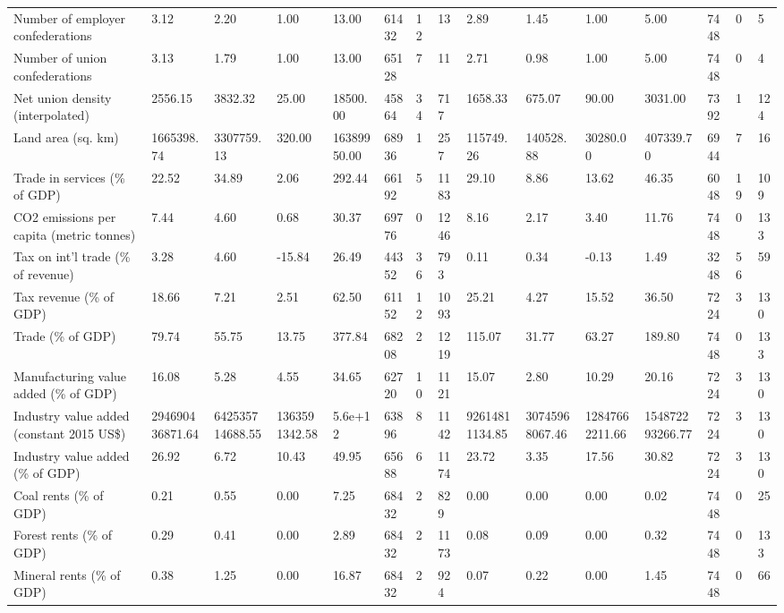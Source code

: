 \begin{longtable}{lllllllllllllll}
\addlinespace
Number of employer confederations & 3.12 & 2.20 & 1.00 & 13.00 & 61432 & 12 & 13 & 2.89 & 1.45 & 1.00 & 5.00 & 7448 & 0 & 5\\
Number of union confederations & 3.13 & 1.79 & 1.00 & 13.00 & 65128 & 7 & 11 & 2.71 & 0.98 & 1.00 & 5.00 & 7448 & 0 & 4\\
Net union density (interpolated) & 2556.15 & 3832.32 & 25.00 & 18500.00 & 45864 & 34 & 717 & 1658.33 & 675.07 & 90.00 & 3031.00 & 7392 & 1 & 124\\
Land area (sq. km) & 1665398.74 & 3307759.13 & 320.00 & 16389950.00 & 68936 & 1 & 257 & 115749.26 & 140528.88 & 30280.00 & 407339.70 & 6944 & 7 & 16\\
Trade in services (\% of GDP) & 22.52 & 34.89 & 2.06 & 292.44 & 66192 & 5 & 1183 & 29.10 & 8.86 & 13.62 & 46.35 & 6048 & 19 & 109\\
\addlinespace
CO2 emissions per capita (metric tonnes) & 7.44 & 4.60 & 0.68 & 30.37 & 69776 & 0 & 1246 & 8.16 & 2.17 & 3.40 & 11.76 & 7448 & 0 & 133\\
Tax on int'l trade (\% of revenue) & 3.28 & 4.60 & -15.84 & 26.49 & 44352 & 36 & 793 & 0.11 & 0.34 & -0.13 & 1.49 & 3248 & 56 & 59\\
Tax revenue (\% of GDP) & 18.66 & 7.21 & 2.51 & 62.50 & 61152 & 12 & 1093 & 25.21 & 4.27 & 15.52 & 36.50 & 7224 & 3 & 130\\
Trade (\% of GDP) & 79.74 & 55.75 & 13.75 & 377.84 & 68208 & 2 & 1219 & 115.07 & 31.77 & 63.27 & 189.80 & 7448 & 0 & 133\\
Manufacturing value added (\% of GDP) & 16.08 & 5.28 & 4.55 & 34.65 & 62720 & 10 & 1121 & 15.07 & 2.80 & 10.29 & 20.16 & 7224 & 3 & 130\\
\addlinespace
Industry value added (constant 2015 US\$) & 294690436871.64 & 642535714688.55 & 1363591342.58 & 5.6e+12 & 63896 & 8 & 1142 & 92614811134.85 & 30745968067.46 & 12847662211.66 & 154872293266.77 & 7224 & 3 & 130\\
Industry value added (\% of GDP) & 26.92 & 6.72 & 10.43 & 49.95 & 65688 & 6 & 1174 & 23.72 & 3.35 & 17.56 & 30.82 & 7224 & 3 & 130\\
Coal rents (\% of GDP) & 0.21 & 0.55 & 0.00 & 7.25 & 68432 & 2 & 829 & 0.00 & 0.00 & 0.00 & 0.02 & 7448 & 0 & 25\\
Forest rents (\% of GDP) & 0.29 & 0.41 & 0.00 & 2.89 & 68432 & 2 & 1173 & 0.08 & 0.09 & 0.00 & 0.32 & 7448 & 0 & 133\\
Mineral rents (\% of GDP) & 0.38 & 1.25 & 0.00 & 16.87 & 68432 & 2 & 924 & 0.07 & 0.22 & 0.00 & 1.45 & 7448 & 0 & 66\\

\end{longtable}

